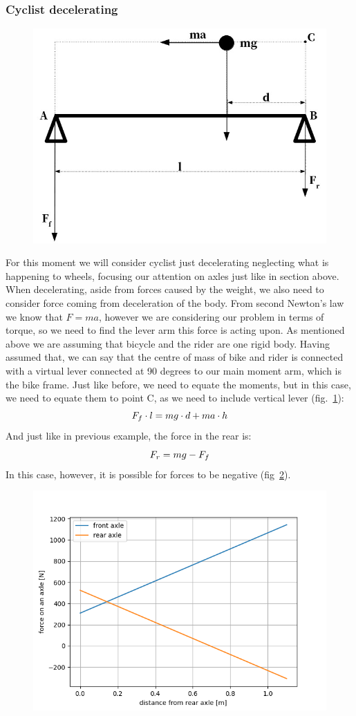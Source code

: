 \documentclass[12pt, a4]{article}
\begin{document}
\subsubsection{Cyclist decelerating}
\begin{figure}[H]
\centering
\caption{}
\includegraphics[width=0.5\linewidth]{decelerating_forces_diagram}%
\label{fig:deceleration_diagram}
\end{figure}
For this moment we will consider cyclist just decelerating neglecting what is happening to wheels, focusing
our attention on axles just like in section above. When decelerating, aside from forces caused by the weight, 
we also need to consider force coming from deceleration of the body. From second Newton's law we know that 
$F = ma$, however we are considering our problem in terms of torque, so we need to find the lever arm this
force is acting upon. As mentioned above we are assuming that bicycle and the rider are one rigid body. 
Having assumed that, we can say that the centre of mass of bike and rider is connected with a virtual lever
connected at 90 degrees to our main moment arm, which is the bike frame. Just like before, we need to equate 
the moments, but in this case, we need to equate them to point C, as we need to include vertical lever 
(fig.~\ref{fig:deceleration_diagram}): 
\begin{equation}
\centering%
\label{eq:eq_torques_dyn}
F_f \cdot l = mg \cdot d + ma \cdot h
\end{equation}
And just like in previous example, the force in the rear is: 
\begin{equation}
\centering%
\label{eq:eq_torques_dyn}
F_r = mg - F_f
\end{equation}
In this case, however, it is possible for forces to be negative (fig~\ref{fig:dynamic_graph}).
\begin{figure}[H]
\centering
\caption{}
\includegraphics[width=0.6\linewidth]{axles_dynamic_graph}%
\label{fig:dynamic_graph}
\end{figure}
\end{document}
